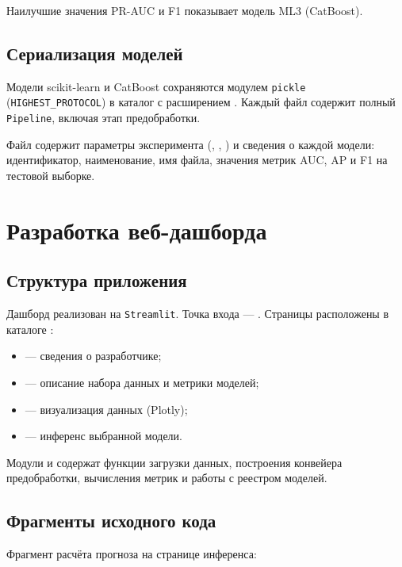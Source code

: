 \documentclass[14pt,a4paper]{extarticle}
\begin{document}
Наилучшие значения PR-AUC и F1 показывает модель ML3 (CatBoost).

\subsection{Сериализация моделей}

Модели scikit-learn и CatBoost сохраняются модулем \texttt{pickle} (\texttt{HIGHEST\_PROTOCOL}) в каталог  с расширением . Каждый файл содержит полный \texttt{Pipeline}, включая этап предобработки.

Файл  содержит параметры эксперимента (, , ) и сведения о каждой модели: идентификатор, наименование, имя файла, значения метрик AUC, AP и F1 на тестовой выборке.

\section{Разработка веб-дашборда}

\subsection{Структура приложения}

Дашборд реализован на \texttt{Streamlit}. Точка входа --- . Страницы расположены в каталоге :
\begin{itemize}
  \item {} --- сведения о разработчике;
  \item {} --- описание набора данных и метрики моделей;
  \item {} --- визуализация данных (Plotly);
  \item {} --- инференс выбранной модели.
\end{itemize}

Модули  и  содержат функции загрузки данных, построения конвейера предобработки, вычисления метрик и работы с реестром моделей.

\subsection{Фрагменты исходного кода}

Фрагмент расчёта прогноза на странице инференса:
\end{document}
